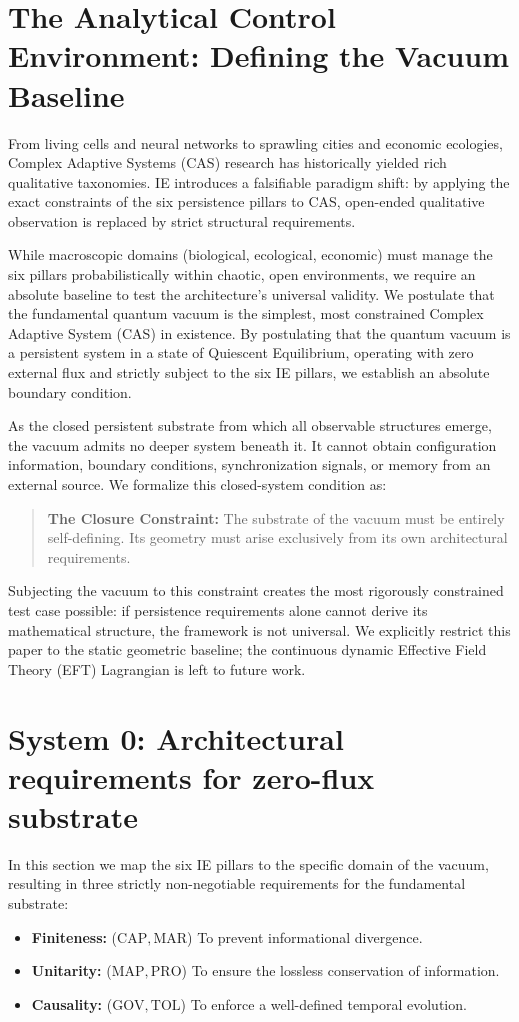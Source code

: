 \section{The Analytical Control Environment: Defining the Vacuum Baseline}
\label{sec:the_test_case}
From living cells and neural networks to sprawling cities and economic ecologies, Complex Adaptive Systems (CAS) research has historically yielded rich qualitative taxonomies. IE introduces a falsifiable paradigm shift: by applying the exact constraints of the six persistence pillars to CAS, open-ended qualitative observation is replaced by strict structural requirements.

While macroscopic domains (biological, ecological, economic) must manage the six pillars probabilistically within chaotic, open environments, we require an absolute baseline to test the architecture's universal validity. We postulate that the fundamental quantum vacuum is the simplest, most constrained Complex Adaptive System (CAS) in existence. By postulating that the quantum vacuum is a persistent system in a state of Quiescent Equilibrium, operating with zero external flux and strictly subject to the six IE pillars, we establish an absolute boundary condition.

As the closed persistent substrate from which all observable structures emerge, the vacuum admits no deeper system beneath it. It cannot obtain configuration information, boundary conditions, synchronization signals, or memory from an external source. We formalize this closed-system condition as:
\begin{quote}
\textbf{The Closure Constraint:} The substrate of the vacuum must be entirely self-defining. Its geometry must arise exclusively from its own architectural requirements.
\end{quote}
\label{subsec:closure}

Subjecting the vacuum to this constraint creates the most rigorously constrained test case possible: if persistence requirements alone cannot derive its mathematical structure, the framework is not universal. We explicitly restrict this paper to the static geometric baseline; the continuous dynamic Effective Field Theory (EFT) Lagrangian is left to future work.

\section{System 0: Architectural requirements for zero-flux substrate}
\label{sec:System0_vacuum_requirements}
In this section we map the six IE pillars to the specific domain of the vacuum, resulting in three strictly non-negotiable requirements for the fundamental substrate:
\begin{itemize}
    \item \textbf{Finiteness:} ($\mathrm{CAP}, \mathrm{MAR}$) To prevent informational divergence.
    \item \textbf{Unitarity:} ($\mathrm{MAP}, \mathrm{PRO}$) To ensure the lossless conservation of information.
    \item \textbf{Causality:} ($\mathrm{GOV}, \mathrm{TOL}$) To enforce a well-defined temporal evolution.
\end{itemize}

